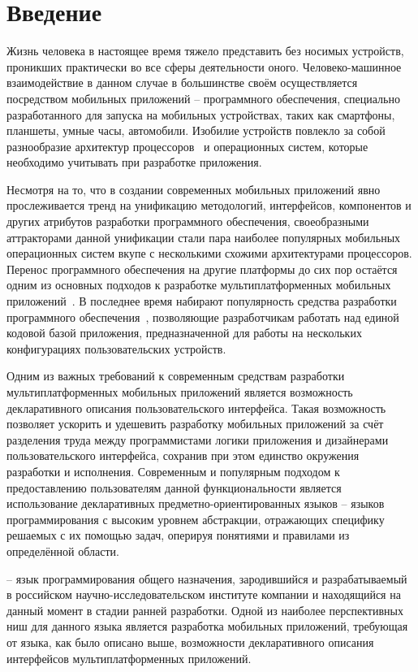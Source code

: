 \section*{Введение}
Жизнь человека в настоящее время тяжело представить без носимых устройств,
проникших практически во все сферы деятельности оного.
Человеко-машинное взаимодействие в данном случае в большинстве своём
осуществляется посредством мобильных приложений -- программного обеспечения, специально разработанного для запуска на мобильных устройствах, таких как
смартфоны, планшеты, умные часы, автомобили.
Изобилие устройств повлекло за собой разнообразие архитектур
процессоров~\cite{cpu-arches, mobile-phones-cpu-trends} и операционных систем, которые необходимо учитывать при разработке приложения.

Несмотря на то, что в создании современных мобильных приложений явно
прослеживается тренд на унификацию методологий, интерфейсов, компонентов и других атрибутов разработки программного обеспечения, своеобразными
аттракторами данной унификации стали пара наиболее популярных мобильных операционных систем вкупе с несколькими схожими архитектурами процессоров. 
Перенос программного обеспечения на другие платформы до сих пор остаётся одним
из основных подходов к разработке мультиплатформенных мобильных
приложений~\cite{mob-apps-approaches}.
В последнее время набирают популярность средства разработки программного
обеспечения~\cite{kotlin-homepage,swift-homepage,flutter-homepage,
reactnative-homepage, vuenative-homepage}, позволяющие разработчикам работать
над единой кодовой базой приложения, предназначенной для работы на нескольких
конфигурациях пользовательских устройств.

Одним из важных требований к современным средствам разработки
мультиплатформенных мобильных приложений является возможность декларативного
описания пользовательского интерфейса.
Такая возможность позволяет ускорить и удешевить разработку мобильных
приложений за счёт разделения труда между программистами логики приложения и
дизайнерами пользовательского интерфейса, сохранив при этом единство окружения
разработки и исполнения.
Современным и популярным подходом к предоставлению пользователям данной
функциональности является использование декларативных
предметно-ориентированных языков -- языков программирования с высоким уровнем
абстракции, отражающих специфику решаемых с их помощью задач, оперируя понятиями и правилами из определённой области.

 -- язык программирования общего назначения, зародившийся и
разрабатываемый в российском научно-исследовательском институте компании
 и находящийся на данный момент в стадии ранней разработки.
Одной из наиболее перспективных ниш для данного языка является разработка
мобильных приложений, требующая от языка, как было описано выше, возможности
декларативного описания интерфейсов мультиплатформенных приложений.